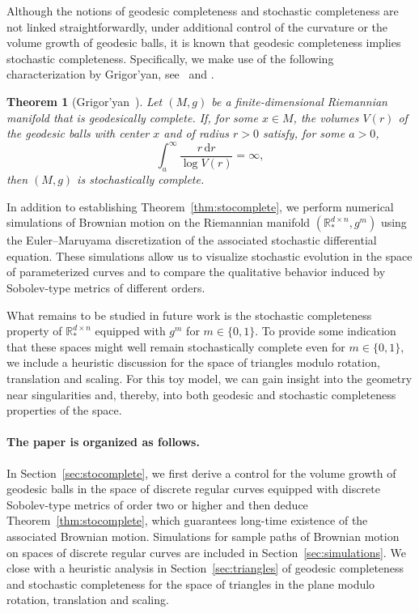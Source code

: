 \documentclass[11pt]{article}
\newtheorem{thm}{Theorem}
\newcommand{\R}{\mathbb{R}}
\newcommand{\dd}{\,{\mathrm d}}
\begin{document}
Although the notions of geodesic completeness and stochastic completeness are not linked straightforwardly, under additional control of the curvature or the volume growth of geodesic balls, it is known that geodesic completeness implies stochastic completeness. Specifically, we make use of the following characterization by Grigor'yan, see~\cite[Theorem~1]{grigoryan1} and \cite[Theorem~9.1]{grigoryan2}.
\begin{thm}[Grigor'yan~\cite{grigoryan1,grigoryan2}]\label{thm:grigoryan}
    Let $(M,g)$ be a finite-dimensional Riemannian manifold that is geodesically complete. If, for some $x\in M$, the volumes $V(r)$ of the geodesic balls with center $x$ and of radius $r>0$ satisfy, for some $a>0$,
    \begin{displaymath}
        \int_a^\infty\frac{r\dd r}{\log V(r)} =\infty,
    \end{displaymath}
    then $(M,g)$ is stochastically complete.
\end{thm}

In addition to establishing Theorem~\ref{thm:stocomplete}, we perform numerical simulations of Brownian motion on the Riemannian manifold $(\mathbb{R}_*^{d\times n}, g^m)$ using the Euler--Maruyama discretization of the associated stochastic differential equation. These simulations allow us to visualize stochastic evolution in the space of parameterized curves and to compare the qualitative behavior induced by Sobolev-type metrics of different orders.  

What remains to be studied in future work is the stochastic completeness property of $\R_*^{d\times n}$ equipped with $g^m$ for $m\in\{0,1\}$. To provide some indication that these spaces might well remain stochastically complete even for $m\in\{0,1\}$, we include a heuristic discussion for the space of triangles modulo rotation, translation and scaling. For this toy model, we can gain insight into the geometry near singularities and, thereby, into both geodesic and stochastic completeness properties of the space.

\paragraph{The paper is organized as follows.}
In Section~\ref{sec:stocomplete}, we first derive a control for the volume growth of geodesic balls in the space of discrete regular curves equipped with discrete Sobolev-type metrics of
order two or higher and then deduce Theorem~\ref{thm:stocomplete}, which guarantees long-time existence of the associated Brownian motion. Simulations for sample paths of Brownian motion on spaces of discrete regular curves are included in Section~\ref{sec:simulations}. We close with a heuristic analysis in Section~\ref{sec:triangles} of geodesic completeness and stochastic completeness for the space of triangles in the plane modulo rotation, translation and scaling.
\end{document}
